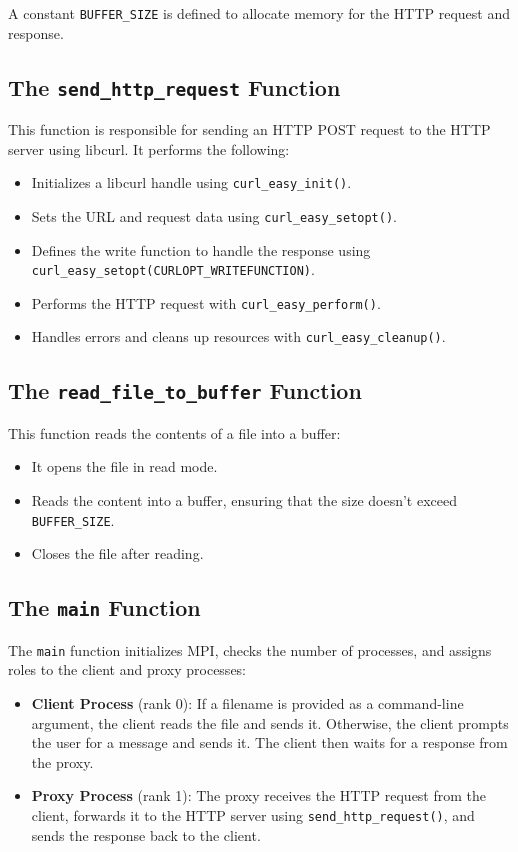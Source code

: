 \documentclass[a4paper,12pt]{article}
\begin{document}
A constant \texttt{BUFFER\_SIZE} is defined to allocate memory for the HTTP request and response.

\subsection{The \texttt{send\_http\_request} Function}
This function is responsible for sending an HTTP POST request to the HTTP server using libcurl. It performs the following:
\begin{itemize}
    \item Initializes a libcurl handle using \texttt{curl\_easy\_init()}.
    \item Sets the URL and request data using \texttt{curl\_easy\_setopt()}.
    \item Defines the write function to handle the response using \texttt{curl\_easy\_setopt(CURLOPT\_WRITEFUNCTION)}.
    \item Performs the HTTP request with \texttt{curl\_easy\_perform()}.
    \item Handles errors and cleans up resources with \texttt{curl\_easy\_cleanup()}.
\end{itemize}

\subsection{The \texttt{read\_file\_to\_buffer} Function}
This function reads the contents of a file into a buffer:
\begin{itemize}
    \item It opens the file in read mode.
    \item Reads the content into a buffer, ensuring that the size doesn't exceed \texttt{BUFFER\_SIZE}.
    \item Closes the file after reading.
\end{itemize}

\subsection{The \texttt{main} Function}
The \texttt{main} function initializes MPI, checks the number of processes, and assigns roles to the client and proxy processes:
\begin{itemize}
    \item \textbf{Client Process} (rank 0): If a filename is provided as a command-line argument, the client reads the file and sends it. Otherwise, the client prompts the user for a message and sends it. The client then waits for a response from the proxy.
    \item \textbf{Proxy Process} (rank 1): The proxy receives the HTTP request from the client, forwards it to the HTTP server using \texttt{send\_http\_request()}, and sends the response back to the client.
\end{itemize}
\end{document}
